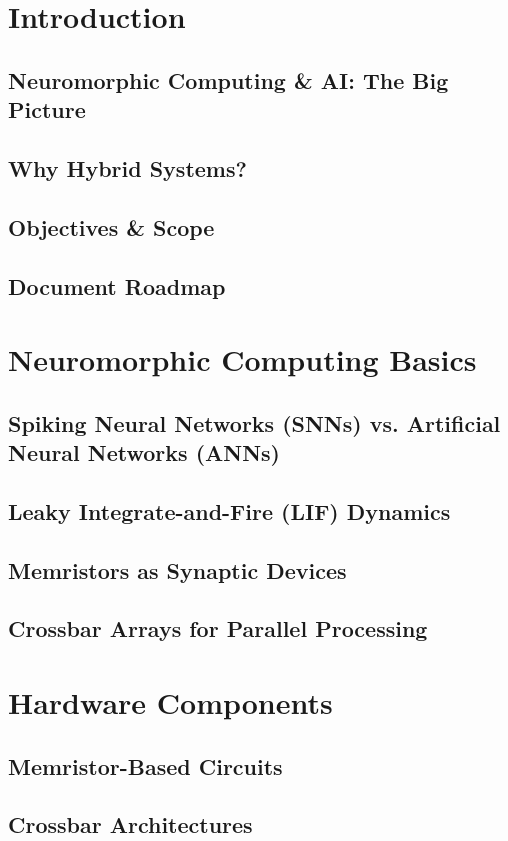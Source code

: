 \chapter{Introduction}
\section{Neuromorphic Computing \& AI: The Big Picture}
\section{Why Hybrid Systems?}
\section{Objectives \& Scope}
\section{Document Roadmap}

\chapter{Neuromorphic Computing Basics}
\section{Spiking Neural Networks (SNNs) vs. Artificial Neural Networks (ANNs)}
\section{Leaky Integrate-and-Fire (LIF) Dynamics}
\section{Memristors as Synaptic Devices}
\section{Crossbar Arrays for Parallel Processing}

\chapter{Hardware Components}
\section{Memristor-Based Circuits}
\section{Crossbar Architectures}
